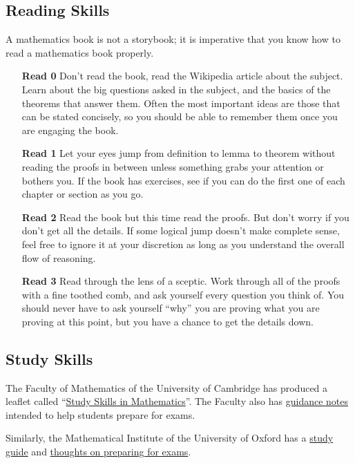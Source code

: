 \subsection*{Reading Skills}
A mathematics book is not a storybook; it is imperative that you know how to read a mathematics book properly.
\begin{enumerate}[leftmargin=1.3cm]
\item[\textbf{Read 0}] Don't read the book, read the Wikipedia article about the subject. Learn about the big questions asked in the subject, and the basics of the theorems that answer them. Often the most important ideas are those that can be stated concisely, so you should be able to remember them once you are engaging the book.
\item[\textbf{Read 1}] Let your eyes jump from definition to lemma to theorem without reading the proofs in between unless something grabs your attention or bothers you. If the book has exercises, see if you can do the first one of each chapter or section as you go.
\item[\textbf{Read 2}] Read the book but this time read the proofs. But don't worry if you don't get all the details. If some logical jump doesn't make complete sense, feel free to ignore it at your discretion as long as you understand the overall flow of reasoning.
\item[\textbf{Read 3}] Read through the lens of a sceptic. Work through all of the proofs with a fine toothed comb, and ask yourself every question you think of. You should never have to ask yourself ``why'' you are proving what you are proving at this point, but you have a chance to get the details down.
\end{enumerate}

\subsection*{Study Skills}
The Faculty of Mathematics of the University of Cambridge has produced a leaflet called ``\href{https://www.maths.cam.ac.uk/undergrad/files/studyskills.pdf}{Study Skills in Mathematics}''. The Faculty also has \href{https://www.maths.cam.ac.uk/undergrad/files/Advice%20on%20Preparing%20for%20Exams%202022.pdf}{guidance notes} intended to help students prepare for exams.

Similarly, the Mathematical Institute of the University of Oxford has a \href{https://www.maths.ox.ac.uk/system/files/attachments/study_public_0.pdf}{study guide} and \href{https://www.maths.ox.ac.uk/system/files/attachments/Revision_advice_final_0.pdf}{thoughts on preparing for exams}.
\pagebreak

\tableofcontents
\pagebreak
